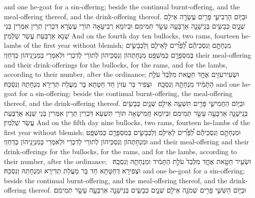 {and one he-goat for a sin-offering; beside the continual burnt-offering, and the meal-offering thereof, and the drink-offering thereof.}{}
{וּבַיּ֧וֹם הָרְבִיעִ֛י פָּרִ֥ים עֲשָׂרָ֖ה אֵילִ֣ם שְׁנָ֑יִם כְּבָשִׂ֧ים בְּנֵֽי\maqqaf שָׁנָ֛ה אַרְבָּעָ֥ה עָשָׂ֖ר תְּמִימִֽם׃}
{וּבְיוֹמָא רְבִיעָאָה תּוֹרֵי עֶשְׂרָא דִּכְרִין תְּרֵין אִמְּרִין בְּנֵי שְׁנָא אַרְבְּעַת עֲשַׂר שַׁלְמִין׃}
{And on the fourth day ten bullocks, two rams, fourteen he-lambs of the first year without blemish;}{}
{מִנְחָתָ֣ם וְנִסְכֵּיהֶ֡ם לַ֠פָּרִ֠ים לָאֵילִ֧ם וְלַכְּבָשִׂ֛ים בְּמִסְפָּרָ֖ם כַּמִּשְׁפָּֽט׃}
{מִנְחָתְהוֹן וְנִסְכֵּיהוֹן לְתוֹרֵי לְדִכְרֵי וּלְאִמְּרֵי בְּמִנְיָנֵיהוֹן כְּדַחְזֵי׃}
{their meal-offering and their drink-offerings for the bullocks, for the rams, and for the lambs, according to their number, after the ordinance;}{}
{וּשְׂעִיר\maqqaf עִזִּ֥ים אֶחָ֖ד חַטָּ֑את מִלְּבַד֙ עֹלַ֣ת הַתָּמִ֔יד מִנְחָתָ֖הּ וְנִסְכָּֽהּ׃ \setuma }
{וּצְפִיר בַּר עִזִּין חַד חַטָּתָא בָּר מֵעֲלַת תְּדִירָא מִנְחָתַהּ וְנִסְכַּהּ׃}
{and one he-goat for a sin-offering; beside the continual burnt-offering, the meal-offering thereof, and the drink-offering thereof.}{}
{וּבַיּ֧וֹם הַחֲמִישִׁ֛י פָּרִ֥ים תִּשְׁעָ֖ה אֵילִ֣ם שְׁנָ֑יִם כְּבָשִׂ֧ים בְּנֵֽי\maqqaf שָׁנָ֛ה אַרְבָּעָ֥ה עָשָׂ֖ר תְּמִימִֽם׃}
{וּבְיוֹמָא חֲמִישָׁאָה תּוֹרֵי תִּשְׁעָא דִּכְרִין תְּרֵין אִמְּרִין בְּנֵי שְׁנָא אַרְבְּעַת עֲשַׂר שַׁלְמִין׃}
{And on the fifth day nine bullocks, two rams, fourteen he-lambs of the first year without blemish;}{}
{וּמִנְחָתָ֣ם וְנִסְכֵּיהֶ֡ם לַ֠פָּרִ֠ים לָאֵילִ֧ם וְלַכְּבָשִׂ֛ים בְּמִסְפָּרָ֖ם כַּמִּשְׁפָּֽט׃}
{וּמִנְחָתְהוֹן וְנִסְכֵּיהוֹן לְתוֹרֵי לְדִכְרֵי וּלְאִמְּרֵי בְּמִנְיָנֵיהוֹן כְּדַחְזֵי׃}
{and their meal-offering and their drink-offerings for the bullocks, for the rams, and for the lambs, according to their number, after the ordinance;}{}
{וּשְׂעִ֥יר חַטָּ֖את אֶחָ֑ד מִלְּבַד֙ עֹלַ֣ת הַתָּמִ֔יד וּמִנְחָתָ֖הּ וְנִסְכָּֽהּ׃ \setuma }
{וּצְפִירָא דְּחַטָּתָא חַד בָּר מֵעֲלַת תְּדִירָא וּמִנְחָתַהּ וְנִסְכַּהּ׃}
{and one he-goat for a sin-offering; beside the continual burnt-offering, and the meal-offering thereof, and the drink-offering thereof.}{}
{וּבַיּ֧וֹם הַשִּׁשִּׁ֛י פָּרִ֥ים שְׁמֹנָ֖ה אֵילִ֣ם שְׁנָ֑יִם כְּבָשִׂ֧ים בְּנֵי\maqqaf שָׁנָ֛ה אַרְבָּעָ֥ה עָשָׂ֖ר תְּמִימִֽם׃}
